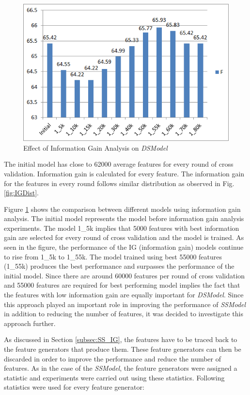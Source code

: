 \begin{figure}
\centering
\includegraphics[scale=0.7]{figures/DSIGResults.png}
\caption{Effect of Information Gain Analysis on \textit{DSModel}}\label{fig:DSIG}
\end{figure}


The initial model has close to 62000 average features for every round of cross validation. Information gain is calculated for every feature. The information gain for the features in every round follows similar distribution as observed in Fig. \ref{fig:IGDist}.

Figure \ref{fig:DSIG} shows the comparison between different models using information gain analysis. The initial model represents the model before information gain analysis experiments. The model 1\_5k implies that 5000 features with best information gain are selected for every round of cross validation and the model is trained. As seen in the figure, the performance of the IG (information gain) models continue to rise from 1\_5k to 1\_55k. The model trained using best 55000 features (1\_55k) produces the best performance and surpasses the performance of the initial model. Since there are around 60000 features per round of cross validation and 55000 features are required for best performing model implies the fact that the features with low information gain are equally important for \textit{DSModel}. Since this approach played an important role in improving the performance of \textit{SSModel} in addition to reducing the number of features, it was decided to investigate this approach further.

As discussed in Section \ref{subsec:SS_IG}, the features have to be traced back to the feature generators that produce them. These feature generators can then be discarded in order to improve the performance and reduce the number of features. As in the case of the \textit{SSModel}, the feature generators were assigned a statistic and experiments were carried out using these statistics. Following statistics were used for every feature generator:

